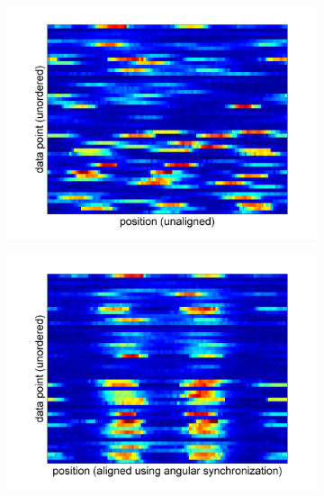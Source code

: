 \documentclass[10pt]{article}
\begin{document}
\begin{figure}[H]
\begin{subfigure}{0.3\textwidth}
\includegraphics[width=\textwidth]{data_unaligned_unordered}
\caption{}
\end{subfigure}
\begin{subfigure}{0.3\textwidth}
\includegraphics[width=\textwidth]{data_aligned_unordered}
\caption{}
\end{subfigure}
\begin{subfigure}{0.3\textwidth}

\end{subfigure}
\end{figure}
\end{document}
